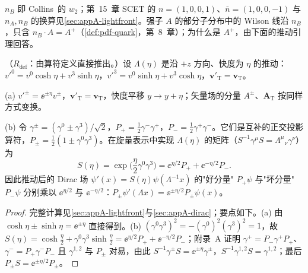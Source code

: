 $n_B$ 即 Collins~\cite{Collins2011}的 $w_2$；第~15~章 SCET 的 $n=(1,0,0,1)$、$\bar n=(1,0,0,-1)$ 与 $n_A,n_B$ 的换算见\cref{sec:appA-lightfront}。强子 $A$ 的部分子分布中的 Wilson 线沿 $n_B$，只含 $n_B\cdot A=A^+$（\cref{def:pdf-quark}，第~8~章）；为什么是 $A^+$，由下面的推动引理回答。

\begin{lemma}\label{lem:prelim-boost}
（$R_{\mathrm{def}}$：由算符定义直接推出。）设 $\Lambda(\eta)$ 是沿 $+z$ 方向、快度为 $\eta$ 的推动：$v'^0=v^0\cosh\eta+v^3\sinh\eta$，$v'^3=v^0\sinh\eta+v^3\cosh\eta$，$\mathbf v'_{\mathrm T}=\mathbf v_{\mathrm T}$。
\par
(a) $v'^\pm=\ee^{\pm\eta}v^\pm$，$\mathbf v'_{\mathrm T}=\mathbf v_{\mathrm T}$，快度平移 $y\to y+\eta$；矢量场的分量 $A^\pm$、$\mathbf A_{\mathrm T}$ 按同样方式变换。
\par
(b) 令 $\gamma^\pm=(\gamma^0\pm\gamma^3)/\sqrt2$，$P_+=\frac12\gamma^-\gamma^+$，$P_-=\frac12\gamma^+\gamma^-$。它们是互补的正交投影算符，$P_\pm=\frac12(1\pm\gamma^0\gamma^3)$。在旋量表示中实现 $\Lambda(\eta)$ 的矩阵（$S^{-1}\gamma^\mu S=\Lambda^\mu{}_\nu\gamma^\nu$）为
\begin{equation}\label{eq:prelim-boost-spinor}
S(\eta)=\exp\Big(\frac\eta2\gamma^0\gamma^3\Big)=\ee^{\eta/2}P_++\ee^{-\eta/2}P_- .
\end{equation}
因此推动后的 Dirac 场 $\psi'(x)=S(\eta)\psi(\Lambda^{-1}x)$ 的"好分量" $P_+\psi$ 与"坏分量" $P_-\psi$ 分别乘以 $\ee^{\eta/2}$ 与 $\ee^{-\eta/2}$：$P_\pm\psi'(\Lambda x)=\ee^{\pm\eta/2}P_\pm\psi(x)$。
\end{lemma}

\begin{proof}
完整计算见\cref{sec:appA-lightfront}与\cref{sec:appA-dirac}；要点如下。(a) 由 $\cosh\eta\pm\sinh\eta=\ee^{\pm\eta}$ 直接得到。(b) $(\gamma^0\gamma^3)^2=-(\gamma^0)^2(\gamma^3)^2=1$，故 $S(\eta)=\cosh\frac\eta2+\gamma^0\gamma^3\sinh\frac\eta2=\ee^{\eta/2}P_++\ee^{-\eta/2}P_-$；附录~A 证明 $\gamma^+=P_-\gamma^+P_+$、$\gamma^-=P_+\gamma^-P_-$ 且 $\gamma^{1,2}$ 与 $P_\pm$ 对易，由此 $S^{-1}\gamma^\pm S=\ee^{\pm\eta}\gamma^\pm$，$S^{-1}\gamma^{1,2}S=\gamma^{1,2}$；最后 $P_\pm S=\ee^{\pm\eta/2}P_\pm$。
\end{proof}

